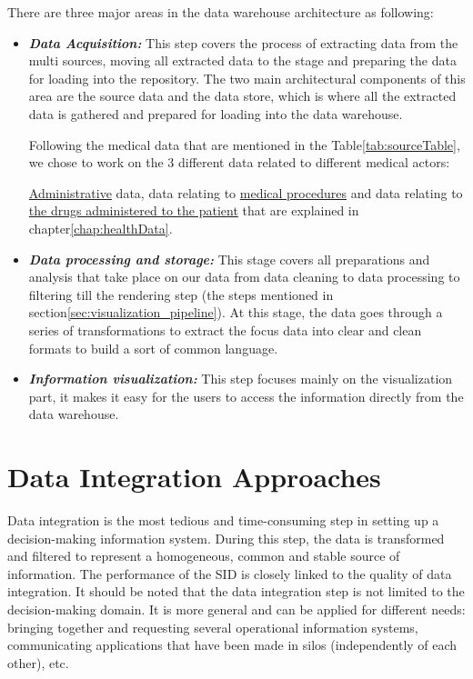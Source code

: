 There are three major areas in the data warehouse architecture as following:
\begin{itemize}
  \item \textbf{\textit{Data Acquisition:}} This step covers the process of extracting data from the multi sources, moving all extracted data to the stage and preparing the data for loading into the repository. The two main architectural components of this area are the source data and the data store, which is where all the extracted data is gathered and prepared for loading into the data warehouse.
  
  Following the medical data that are mentioned in the Table\ref{tab:sourceTable}, we chose to work on  the 3 different data related to different medical actors:

  
  \underline{Administrative} data, data relating to \underline{medical procedures} and data relating to \underline{the drugs administered to the patient} that are explained in chapter\ref{chap:healthData}.
  \item \textbf{\textit{Data processing and storage:}} This stage covers all preparations and analysis that take place on our data from data cleaning to data processing to filtering till the rendering step (the steps mentioned in section\ref{sec:visualization_pipeline}).
  At this stage, the data goes through a series of transformations to extract the focus data into clear and clean formats to build a sort of common language.

  \item \textbf{\textit{Information visualization:}} This step focuses mainly on the visualization part, it makes it easy for the users to access the information directly from the data warehouse.
\end{itemize}



\newpage
\section{Data Integration Approaches} 
Data integration is the most tedious and time-consuming step in setting up a decision-making information system. During this step, the data is transformed and filtered to represent a homogeneous, common and stable source of information. The performance of the SID is closely linked to the quality of data integration. It should be noted that the data integration step is not limited to the decision-making domain. It is more general and can be applied for different needs: bringing together and requesting several operational information systems, communicating applications that have been made in silos (independently of each other), etc.
 
